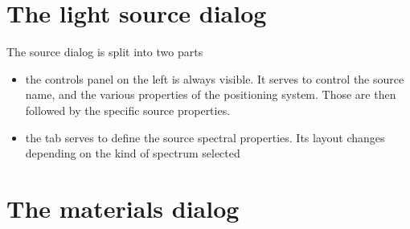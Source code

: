 \section{The light source dialog}

The source dialog is split into two parts
\begin{itemize}
	\item the controls panel on the left is always visible. It serves to control the source name, and the various properties of the positioning system. Those are then followed by the specific source properties.
	\item the  tab serves to define the source spectral properties. Its layout changes depending on the kind of spectrum selected
\end{itemize}

\section{The materials dialog}